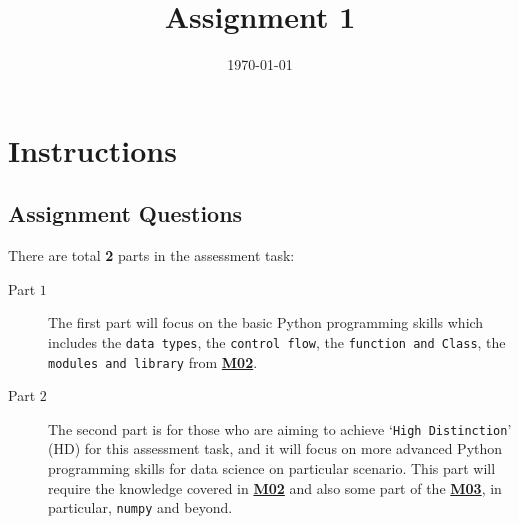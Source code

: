 \documentclass[a4paper]{article}
\date{\today}
\title{Assignment 1}
\begin{document}
    \header{}



    \begin{center}
 
      \end{center}

      \section*{Instructions}


      \subsection*{Assignment Questions}\label{sec:question}
      
      There are total \textbf{2} parts in the assessment task:
      \begin{description}
      \item[Part $1$] 
      The first part will focus on the basic Python programming skills
      which includes the \texttt{data types}, the \texttt{control flow}, the \texttt{function and Class},
      the \texttt{modules and library} from \href{https://github.com/tulip-lab/sit742/tree/develop/Jupyter/M02-Python}{\textbf{M02}}.
          
      \item[Part $2$] 
      The second part is for those who are aiming to 
      achieve `\texttt{High Distinction}' (HD) for this assessment task,
      and it will focus on more advanced Python programming skills for data science on particular scenario. 
      This part will require the knowledge covered in \href{https://github.com/tulip-lab/sit742/tree/develop/Jupyter/M02-Python}{\textbf{M02}} and also some part of the \href{https://github.com/tulip-lab/sit742/blob/develop/Jupyter/M03-BigData/M03D-DataAcquisition-I.ipynb}{\textbf{M03}}, 
      in particular, 
      \texttt{numpy} and beyond.
      \end{description}
      
\end{document}
